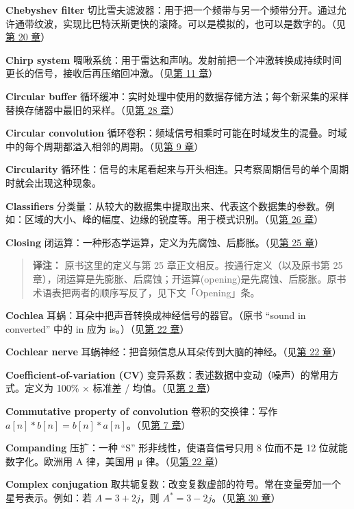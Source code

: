 \textbf{Chebyshev filter}
切比雪夫滤波器：用于把一个频带与另一个频带分开。通过允许通带纹波，实现比巴特沃斯更快的滚降。可以是模拟的，也可以是数字的。（见\hyperref[ch-20]{第
20 章}）

\textbf{Chirp system}
啁啾系统：用于雷达和声呐。发射前把一个冲激转换成持续时间更长的信号，接收后再压缩回冲激。（见\hyperref[ch-11]{第
11 章}）

\textbf{Circular buffer}
循环缓冲：实时处理中使用的数据存储方法；每个新采集的采样替换存储器中最旧的采样。（见\hyperref[ch-28]{第
28 章}）

\textbf{Circular convolution}
循环卷积：频域信号相乘时可能在时域发生的混叠。时域中的每个周期都溢入相邻的周期。（见\hyperref[ch-09]{第
9 章}）

\textbf{Circularity}
循环性：信号的末尾看起来与开头相连。只考察周期信号的单个周期时就会出现这种现象。

\textbf{Classifiers}
分类量：从较大的数据集中提取出来、代表这个数据集的参数。例如：区域的大小、峰的幅度、边缘的锐度等。用于模式识别。（见\hyperref[ch-26]{第
26 章}）

\textbf{Closing}
闭运算：一种形态学运算，定义为先腐蚀、后膨胀。（见\hyperref[ch-25]{第 25
章}）

\begin{quote}
\textbf{译注：} 原书这里的定义与第 25 章正文相反。按通行定义（以及原书第
25
章），闭运算是先膨胀、后腐蚀；开运算(opening)是先腐蚀、后膨胀。原书术语表把两者的顺序写反了，见下文「Opening」条。
\end{quote}

\textbf{Cochlea} 耳蜗：耳朵中把声音转换成神经信号的器官。（原书 ``sound
in converted'' 中的 in 应为 is。）（见\hyperref[ch-22]{第 22 章}）

\textbf{Cochlear nerve}
耳蜗神经：把音频信息从耳朵传到大脑的神经。（见\hyperref[ch-22]{第 22
章}）

\textbf{Coefficient-of-variation (CV)}
变异系数：表述数据中变动（噪声）的常用方式。定义为 100\% × 标准差 /
均值。（见\hyperref[ch-02]{第 2 章}）

\textbf{Commutative property of convolution} 卷积的交换律：写作
\(a[n] * b[n] = b[n] * a[n]\)。（见\hyperref[ch-07]{第 7 章}）

\textbf{Companding} 压扩：一种 ``S'' 形非线性，使语音信号只用 8 位而不是
12 位就能数字化。欧洲用 A 律，美国用 μ 律。（见\hyperref[ch-22]{第 22
章}）

\textbf{Complex conjugation}
取共轭复数：改变复数虚部的符号。常在变量旁加一个星号表示。例如：若
\(A = 3+2j\)，则 \(A^* = 3-2j\)。（见\hyperref[ch-30]{第 30 章}）

